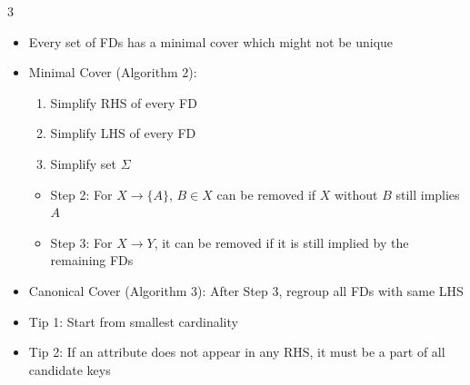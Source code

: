 \documentclass[10pt, landscape]{article}
\begin{document}
\begin{multicols*}{3}
\begin{itemize}
    \item Every set of FDs has a minimal cover which might not be unique
    \item Minimal Cover (Algorithm 2):
    \begin{enumerate}
        \item Simplify RHS of every FD
        \item Simplify LHS of every FD
        \item Simplify set $\Sigma$
    \end{enumerate}
    \begin{itemize}
        \item Step 2: For $X \rightarrow \{A\}$, $B \in X$ can be removed if $X$ without $B$ still implies $A$
        \item Step 3: For $X \rightarrow Y$, it can be removed if it is still implied by the remaining FDs
    \end{itemize}
    \item Canonical Cover (Algorithm 3): After Step 3, regroup all FDs with same LHS
    \item Tip 1: Start from smallest cardinality
    \item Tip 2: If an attribute does not appear in any RHS, it must be a part of all candidate keys
\end{itemize}


\end{multicols*}
\end{document}
